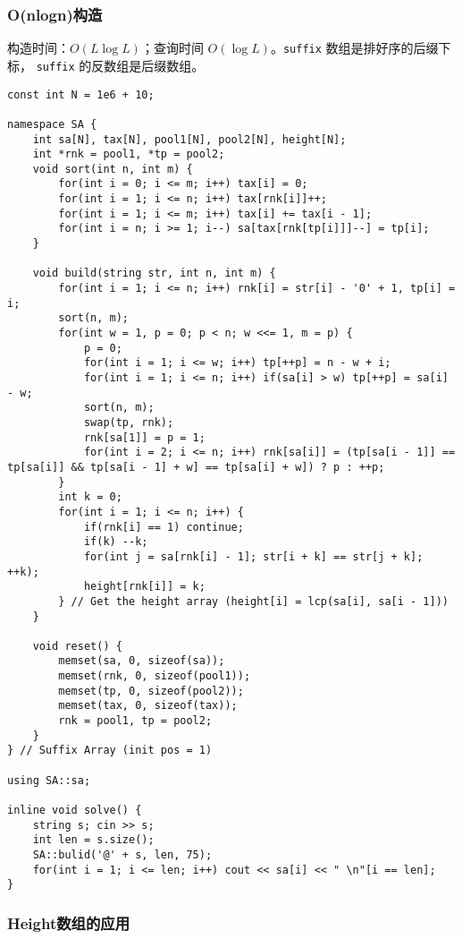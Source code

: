 \documentclass[]{article}
\begin{document}
\hypertarget{onlognux6784ux9020}{%
\subsubsection{O(nlogn)构造}\label{onlognux6784ux9020}}

构造时间：\(O(L \log L)\)；查询时间 \(O(\log L)\)。\texttt{suffix}
数组是排好序的后缀下标， \texttt{suffix} 的反数组是后缀数组。

\begin{verbatim}
const int N = 1e6 + 10;

namespace SA {
    int sa[N], tax[N], pool1[N], pool2[N], height[N];
    int *rnk = pool1, *tp = pool2;
    void sort(int n, int m) {
        for(int i = 0; i <= m; i++) tax[i] = 0;
        for(int i = 1; i <= n; i++) tax[rnk[i]]++;
        for(int i = 1; i <= m; i++) tax[i] += tax[i - 1];
        for(int i = n; i >= 1; i--) sa[tax[rnk[tp[i]]]--] = tp[i];
    }

    void build(string str, int n, int m) {
        for(int i = 1; i <= n; i++) rnk[i] = str[i] - '0' + 1, tp[i] = i;
        sort(n, m);
        for(int w = 1, p = 0; p < n; w <<= 1, m = p) {
            p = 0;
            for(int i = 1; i <= w; i++) tp[++p] = n - w + i;
            for(int i = 1; i <= n; i++) if(sa[i] > w) tp[++p] = sa[i] - w;
            sort(n, m);
            swap(tp, rnk);
            rnk[sa[1]] = p = 1;
            for(int i = 2; i <= n; i++) rnk[sa[i]] = (tp[sa[i - 1]] == tp[sa[i]] && tp[sa[i - 1] + w] == tp[sa[i] + w]) ? p : ++p;
        }
        int k = 0;
        for(int i = 1; i <= n; i++) {
            if(rnk[i] == 1) continue;
            if(k) --k;
            for(int j = sa[rnk[i] - 1]; str[i + k] == str[j + k]; ++k);
            height[rnk[i]] = k;
        } // Get the height array (height[i] = lcp(sa[i], sa[i - 1]))
    } 

    void reset() {
        memset(sa, 0, sizeof(sa));
        memset(rnk, 0, sizeof(pool1));
        memset(tp, 0, sizeof(pool2));
        memset(tax, 0, sizeof(tax));
        rnk = pool1, tp = pool2;
    }
} // Suffix Array (init pos = 1)

using SA::sa;

inline void solve() {
    string s; cin >> s;
    int len = s.size();
    SA::bulid('@' + s, len, 75);
    for(int i = 1; i <= len; i++) cout << sa[i] << " \n"[i == len];
}
\end{verbatim}

\hypertarget{heightux6570ux7ec4ux7684ux5e94ux7528}{%
\subsubsection{Height数组的应用}\label{heightux6570ux7ec4ux7684ux5e94ux7528}}
\end{document}
